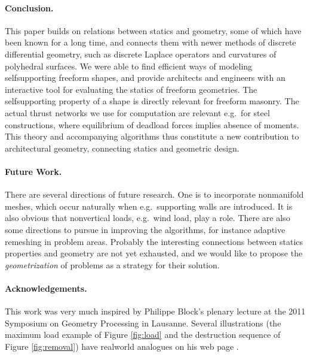 \documentclass[review]{acmsiggraph}
\begin{document}
\paragraph{Conclusion.}

This paper builds on relations between statics and geometry, some of which 
have been known for a long time, and connects them with newer methods of 
discrete differential geometry, such as discrete Laplace operators and 
curvatures of polyhedral surfaces. We were able to find efficient ways of 
modeling self\dash supporting freeform shapes, and provide architects and 
engineers with an interactive tool for evaluating the 
statics of freeform geometries. The self\dash supporting property of a 
shape is directly relevant for freeform masonry. The actual thrust 
networks we use for computation are relevant e.g.\ for steel 
constructions, where equilibrium of deadload forces implies absence of 
moments. This theory and accompanying algorithms thus constitute a new 
contribution to architectural geometry, connecting statics and geometric 
design.

\paragraph{Future Work.}

There are several directions of future research. One is to incorporate 
non\dash manifold meshes, which occur naturally when e.g.\ supporting 
walls are introduced. It is also obvious that non\dash vertical loads, 
e.g.\ wind load, play a role. There are also some directions to pursue in 
improving the algorithms, for instance adaptive remeshing in problem 
areas. Probably the interesting connections between statics properties and 
geometry are not yet exhausted, and we would like to propose the {\em 
geometrization} of problems as a strategy for their solution.

\paragraph*{Acknowledgements.}

This work was very much inspired by Philippe Block's plenary lecture
at the 2011 Symposium on Geometry Processing in Lausanne. Several 
illustrations (the maximum load example of Figure
\ref{fig:load} and the destruction sequence of Figure \ref{fig:removal})
have real\dash world analogues on his web page \cite{catalan}.
\end{document}
